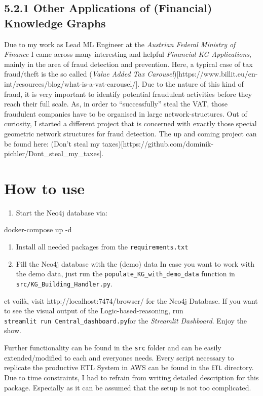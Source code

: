 \documentclass[
]{article}
\newenvironment{Shaded}{}{}
\newcommand{\NormalTok}[1]{#1}
\providecommand{\tightlist}{%
  \setlength{\itemsep}{0pt}\setlength{\parskip}{0pt}}
\begin{document}
\subsection{5.2.1 Other Applications of (Financial) Knowledge
Graphs}\label{other-applications-of-financial-knowledge-graphs}

Due to my work as Lead ML Engineer at the \emph{Austrian Federal
Ministry of Finance} I came across many interesting and helpful
\emph{Financial KG Applications}, mainly in the area of fraud detection
and prevention. Here, a typical case of tax fraud/theft is the so called
(\emph{Value Added Tax
Carousel}){[}https://www.billit.eu/en-int/resources/blog/what-is-a-vat-carousel/{]}.
Due to the nature of this kind of fraud, it is very important to
identify potential fraudulent activities before they reach their full
scale. As, in order to ``successfully'' steal the VAT, those fraudulent
companies have to be organised in large network-structures. Out of
curiosity, I started a different project that is concerned with exactly
those special geometric network structures for fraud detection. The up
and coming project can be found here: (Don't steal my
taxes){[}https://github.com/dominik-pichler/Dont\_steal\_my\_taxes{]}.

\section{How to use}\label{how-to-use}

\begin{enumerate}
\def\labelenumi{\arabic{enumi}.}
\tightlist
\item
  Start the Neo4j database via:
\end{enumerate}

\begin{Shaded}
\begin{Highlighting}[]
\NormalTok{docker{-}compose up {-}d}
\end{Highlighting}
\end{Shaded}

\begin{enumerate}
\def\labelenumi{\arabic{enumi}.}
\setcounter{enumi}{1}
\tightlist
\item
  Install all needed packages from the \texttt{requirements.txt}
\item
  Fill the Neo4j database with the (demo) data In case you want to work
  with the demo data, just run the
  \texttt{populate\_KG\_with\_demo\_data} function in
  \texttt{src/KG\_Building\_Handler.py}.
\end{enumerate}

et voilà, visit http://localhost:7474/browser/ for the Neo4j Database.
If you want to see the visual output of the Logic-based-reasoning, run
\texttt{streamlit\ run\ Central\_dashboard.py}for the \emph{Streamlit
Dashboard}. Enjoy the show.

Further functionality can be found in the \texttt{src} folder and can be
easily extended/modified to each and everyones needs. Every script
necessary to replicate the productive ETL System in AWS can be found in
the \texttt{ETL} directory. Due to time constraints, I had to refrain
from writing detailed description for this package. Especially as it can
be assumed that the setup is not too complicated.
\end{document}
